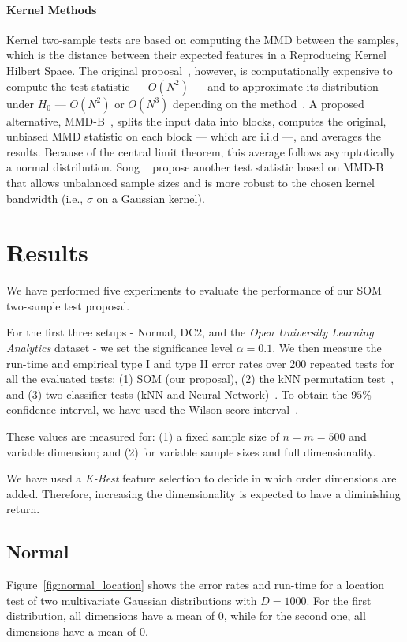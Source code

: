\paragraph{Kernel Methods}
Kernel two-sample tests are based on computing the \gls{MMD} between the samples,
which is the distance between their expected features in a Reproducing Kernel Hilbert Space.
The original proposal~\cite{gretton2012kernel}, however, is computationally
expensive to compute the test statistic --- $O(N^2)$ --- and to approximate its distribution under
$H_0$ --- $O(N^2)$ or $O(N^3)$ depending on the method~\cite{zaremba2013b}.
A proposed alternative, MMD-B~\cite{zaremba2013b}, splits the input data into blocks, computes the original,
unbiased \gls{MMD} statistic on each block --- which are i.i.d ---, and averages the results.
Because of the central limit theorem, this average follows asymptotically a normal distribution.
Song \etal~\cite{song2021fast} propose another test statistic based on MMD-B that allows
unbalanced sample sizes and is more robust to the chosen kernel bandwidth (i.e., $\sigma$ on a Gaussian kernel).

\section{Results}
\label{sec:som_results}

We have performed five experiments to evaluate the performance of our \gls{SOM} 
two-sample test proposal.

For the first three setups - Normal, DC2, and the \emph{Open University Learning Analytics} dataset
- we set the significance level $\alpha = 0.1$. We then measure the run-time and empirical 
type I and type II error rates over $200$ repeated tests for all the evaluated
tests: (1) \gls{SOM}  (our proposal), (2) the \gls{kNN} permutation test~\cite{Schilling1986b},
and (3) two classifier tests (\gls{kNN} and Neural Network)~\cite{lopez2016revisiting}.
To obtain the $95\%$ confidence interval, we have used the Wilson score interval~\cite{Wilson1927}.

These values are measured for: (1) a fixed sample size of $n = m = 500$ and variable dimension;
and (2) for variable sample sizes and full dimensionality.

We have used a \emph{K-Best} feature selection to decide in which order dimensions are added.
Therefore, increasing the dimensionality is expected to have a diminishing return.

\subsection{Normal}
Figure~\ref{fig:normal_location} shows the error rates and run-time for a location
test of two multivariate Gaussian distributions with $D=1000$. For the first distribution,
all dimensions have a mean of $0$, while for the second one, all dimensions have a mean of $0$.

